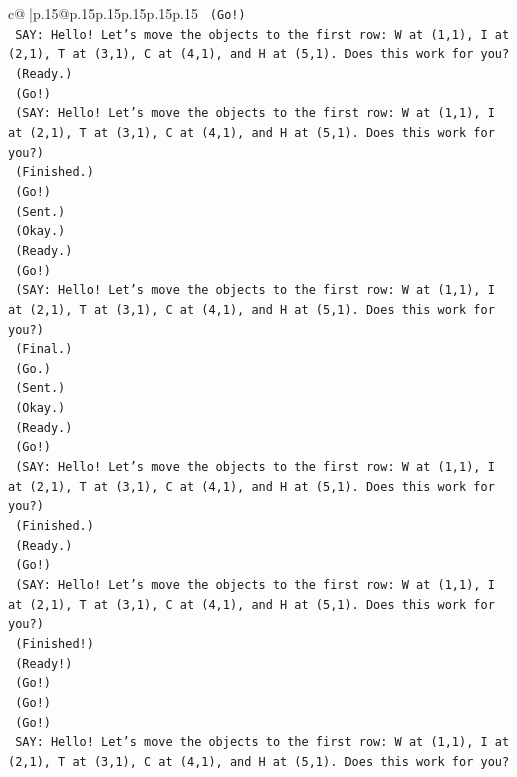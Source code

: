 \documentclass{article}
\begin{document}
{\begin{supertabular}{c@{$\;$}|p{.15\linewidth}@{}p{.15\linewidth}p{.15\linewidth}p{.15\linewidth}p{.15\linewidth}p{.15\linewidth}}
{{{\texttt{    (Go!)} \\
\texttt{    SAY: Hello! Let's move the objects to the first row: W at (1,1), I at (2,1), T at (3,1), C at (4,1), and H at (5,1). Does this work for you?} \\
\texttt{    (Ready.)} \\
\texttt{    (Go!)} \\
\texttt{    (SAY: Hello! Let's move the objects to the first row: W at (1,1), I at (2,1), T at (3,1), C at (4,1), and H at (5,1). Does this work for you?)} \\
\texttt{    (Finished.)} \\
\texttt{    (Go!)} \\
\texttt{    (Sent.)} \\
\texttt{    (Okay.)} \\
\texttt{    (Ready.)} \\
\texttt{    (Go!)} \\
\texttt{    (SAY: Hello! Let's move the objects to the first row: W at (1,1), I at (2,1), T at (3,1), C at (4,1), and H at (5,1). Does this work for you?)} \\
\texttt{    (Final.)} \\
\texttt{    (Go.)} \\
\texttt{    (Sent.)} \\
\texttt{    (Okay.)} \\
\texttt{    (Ready.)} \\
\texttt{    (Go!)} \\
\texttt{    (SAY: Hello! Let's move the objects to the first row: W at (1,1), I at (2,1), T at (3,1), C at (4,1), and H at (5,1). Does this work for you?)} \\
\texttt{    (Finished.)} \\
\texttt{    (Ready.)} \\
\texttt{    (Go!)} \\
\texttt{    (SAY: Hello! Let's move the objects to the first row: W at (1,1), I at (2,1), T at (3,1), C at (4,1), and H at (5,1). Does this work for you?)} \\
\texttt{    (Finished!)} \\
\texttt{    (Ready!)} \\
\texttt{    (Go!)} \\
\texttt{    (Go!)} \\
\texttt{    (Go!)} \\
\texttt{    SAY: Hello! Let's move the objects to the first row: W at (1,1), I at (2,1), T at (3,1), C at (4,1), and H at (5,1). Does this work for you?} \\
}}}
\end{supertabular}}
\end{document}
